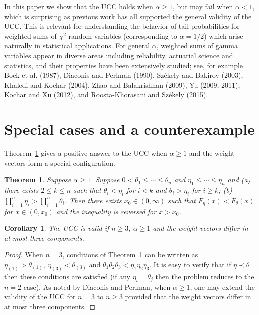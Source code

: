\documentclass[11pt]{article}
\newtheorem{theorem}{\bf Theorem}
\newtheorem{corollary}{\bf Corollary}
\begin{document}
In this paper we show that the UCC holds when $\alpha \geq 1$, but may fail when $\alpha <1$, which is surprising as previous work has all supported the general validity of the UCC.  This is relevant for understanding the behavior of tail probabilities for weighted sums of $\chi^2$ random variables (corresponding to $\alpha=1/2$) which arise naturally in statistical applications.  For general $\alpha$, weighted sums of gamma variables appear in diverse areas including reliability, actuarial science and statistics, and their properties have been extensively studied; see, for example Bock et al. (1987), Diaconis and Perlman (1990), Sz\'{e}kely and Bakirov (2003), Khaledi and Kochar (2004), Zhao and Balakrishnan (2009), Yu (2009, 2011), Kochar and Xu (2012), and Roosta-Khorasani and Sz\'{e}kely (2015).

\section{Special cases and a counterexample}
Theorem~\ref{thm1} gives a positive answer to the UCC when $\alpha \geq 1$ and the weight vectors form a special configuration.  
\begin{theorem}
\label{thm1}
Suppose $\alpha \geq 1$.  Suppose $0<\theta_1\leq \cdots \leq \theta_n$ and $\eta_1\leq \cdots \leq \eta_n$ and (a) there exists $2\leq k\leq n$ such that $\theta_i<\eta_i$ for $i< k$ and $\theta_i > \eta_i$ for $i\geq k$;
(b) $\prod_{i=1}^n \eta_i > \prod_{i=1}^n \theta_i$.  Then there exists $x_0\in (0, \infty)$ such that $F_\eta(x) < F_\theta(x)$ for $x\in (0, x_0)$ and the inequality is reversed for $x> x_0$.
\end{theorem}

\begin{corollary}
\label{coro0}
The UCC is valid if $n\geq 3,\ \alpha\geq 1$ and the weight vectors differ in at most three components.
\end{corollary}
\begin{proof}
When $n=3$, conditions of Theorem~\ref{thm1} can be written as $\eta_{(1)} > \theta_{(1)},\ \eta_{(3)} < \theta_{(3)}$ and $\theta_1\theta_2\theta_3 <\eta_1\eta_2\eta_3$.  It is easy to verify that if $\eta\prec \theta$ then these conditions are satisfied (if any $\eta_i=\theta_j$ then the problem reduces to the $n=2$ case).  As noted by Diaconis and Perlman, when $\alpha\geq 1$, one may extend the validity of the UCC for $n=3$ to $n\geq 3$ provided that the weight vectors differ in at most three components.  
\end{proof}
\end{document}
